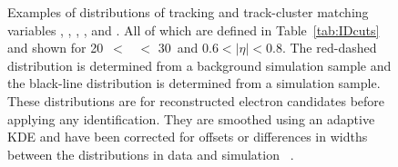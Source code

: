 \begin{figure}[hp]
\begin{subfigure}[b]{0.49\textwidth}
    \label{fig:egamma:deltaPhi_res}
  \end{subfigure}
  \caption[Examples of distributions of tracking and track-cluster matching variables \dOSignificance, \deltapoverp, \TRTPID, \deltaeta, and \deltaphires.]{Examples of distributions of tracking and track-cluster matching variables \dOSignificance, \deltapoverp, \TRTPID, \deltaeta, and \deltaphires.
    All of which are defined in Table~\ref{tab:IDcuts} and shown for 20~\GeV $<$ \et\ $<$ 30~\GeV and $0.6<|\eta|<0.8$.
    The red-dashed distribution is determined from a background simulation sample and the black-line distribution is determined from a \Zee simulation sample.
    These distributions are for reconstructed electron candidates before applying any identification.
    They are smoothed using an adaptive KDE and have been corrected for offsets or differences in widths between the distributions in data and simulation
    ~\cite{Aaboud:2019ynx}.
}
\label{fig:egamma:calorimeter_pdfs}
\end{figure}
